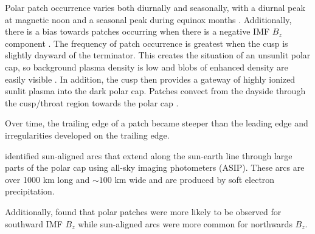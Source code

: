 
Polar patch occurrence varies both diurnally and seasonally, with a diurnal peak at magnetic noon and a seasonal peak during equinox months \citep{Rodger1996}.  Additionally, there is a bias towards patches occurring when there is a negative IMF \(B_z\) component \citep{Buchau1983,Rodger1996}.  The frequency of patch occurrence is greatest when the cusp is slightly dayward of the terminator.  This creates the situation of an unsunlit polar cap, so background plasma density is low and blobs of enhanced density are easily visible \citep{Coley1998}.  In addition, the cusp then provides a gateway of highly ionized sunlit plasma into the dark polar cap.  Patches convect from the dayside through the cusp/throat region towards the polar cap \citep{Kelly1984,Foster1984,Foster1985,Foster1993,Sojka1982,delaBeaujardiere1985}. 



Over time, the trailing edge of a patch became steeper than the leading edge and irregularities developed on the trailing edge.

\citet{Weber1981} identified sun-aligned arcs that extend  along the sun-earth line through large parts of the polar cap using all-sky imaging photometers (ASIP).  These arcs are over 1000 km long and \(\sim100\) km wide and are produced by soft electron precipitation.  

Additionally, \citet{Buchau1983} found that polar patches were more likely to be observed for southward IMF \(B_z\) while sun-aligned arcs were more common for northwards \(B_z\).  


